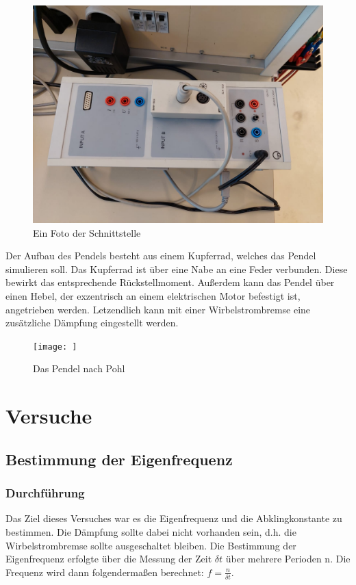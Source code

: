 \documentclass{article}
\begin{document}
\begin{figure}
    \includegraphics[width=\linewidth]{bilder/sensor_cassy.jpg}
    \caption{Ein Foto der Schnittstelle}
    \label{fig:schnittstelle}
\end{figure}

Der Aufbau des Pendels \cite{w:pohl} besteht aus einem Kupferrad, welches das Pendel simulieren soll.
Das Kupferrad ist über eine Nabe an eine Feder verbunden. Diese bewirkt das entsprechende
Rückstellmoment. Außerdem kann das Pendel über einen Hebel, der exzentrisch an einem
elektrischen Motor befestigt ist, angetrieben werden. Letzendlich kann mit einer Wirbelstrombremse
eine zusätzliche Dämpfung eingestellt werden.

\begin{figure}
    \texttt{[image: ]}
    \caption{Das Pendel nach Pohl}
    \label{fig:pendel}
\end{figure}
\clearpage

\section{Versuche}
\subsection{Bestimmung der Eigenfrequenz}
\subsubsection{Durchführung}
Das Ziel dieses Versuches war es die Eigenfrequenz und die Abklingkonstante zu
bestimmen. Die Dämpfung sollte dabei nicht vorhanden sein, d.h. die Wirbelstrombremse
sollte ausgeschaltet bleiben. Die Bestimmung der Eigenfrequenz erfolgte über
die Messung der Zeit $\delta t$ über mehrere Perioden n. Die Frequenz wird dann
folgendermaßen berechnet: $f = \frac{n}{\delta t}$.
\end{document}
